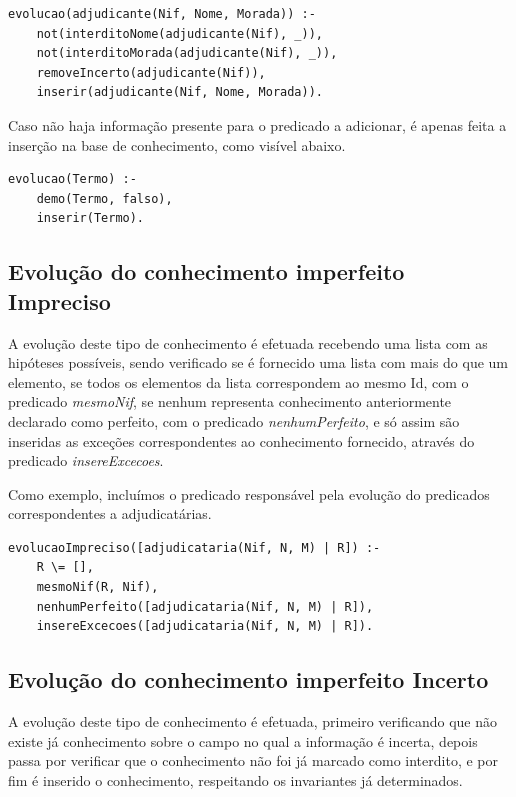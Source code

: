 \documentclass[a4paper]{report}
\begin{document}
\begin{verbatim}
evolucao(adjudicante(Nif, Nome, Morada)) :-
    not(interditoNome(adjudicante(Nif), _)),
    not(interditoMorada(adjudicante(Nif), _)),
    removeIncerto(adjudicante(Nif)),
    inserir(adjudicante(Nif, Nome, Morada)).
\end{verbatim}

Caso não haja informação presente para o predicado a adicionar, é apenas feita a
inserção na base de conhecimento, como visível abaixo.

\begin{verbatim}
evolucao(Termo) :-
    demo(Termo, falso),
    inserir(Termo).
\end{verbatim}

\subsection{Evolução do conhecimento imperfeito Impreciso}

A evolução deste tipo de conhecimento é efetuada recebendo uma lista com as
hipóteses possíveis, sendo verificado se é fornecido uma lista com mais do que
um elemento, se todos os elementos da lista correspondem ao mesmo Id, com o
predicado \textit{mesmoNif}, se nenhum representa conhecimento 
anteriormente declarado como perfeito, com o predicado
\textit{nenhumPerfeito}, e só assim são inseridas as exceções 
correspondentes ao conhecimento fornecido, através do predicado
\textit{insereExcecoes}.

Como exemplo, incluímos o predicado responsável pela evolução do predicados
correspondentes a adjudicatárias.

\begin{verbatim}
evolucaoImpreciso([adjudicataria(Nif, N, M) | R]) :-
    R \= [],
    mesmoNif(R, Nif),
    nenhumPerfeito([adjudicataria(Nif, N, M) | R]),
    insereExcecoes([adjudicataria(Nif, N, M) | R]).
\end{verbatim}

\subsection{Evolução do conhecimento imperfeito Incerto}

A evolução deste tipo de conhecimento é efetuada, primeiro verificando que não
existe já conhecimento sobre o campo no qual a informação é incerta, depois
passa por verificar que o conhecimento não foi já marcado como interdito, e por
fim é inserido o conhecimento, respeitando os invariantes já determinados.
\end{document}
